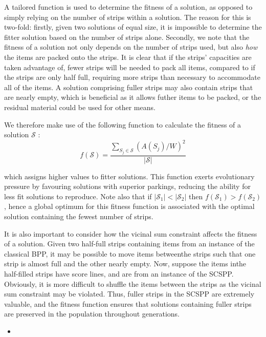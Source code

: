 \documentclass{elsarticle}
\begin{document}
A tailored function is used to determine the fitness of a solution, as opposed to simply relying on the number of strips within a solution. The reason for this is two-fold: firstly, given two solutions of equal size, it is impossible to determine the fitter solution based on the number of strips alone. Secondly, we note that the fitness of a solution not only depends on the number of strips used, but also \emph{how} the items are packed onto the strips. It is clear that if the strips' capacities are taken advantage of, fewer strips will be needed to pack all items, compared to if the strips are only half full, requiring more strips than necessary to accommodate all of the items. A solution comprising fuller strips may also contain strips that are nearly empty, which is beneficial as it allows futher items to be packed, or the residual material could be used for other means. 

We therefore make use of the following function to calculate the fitness of a solution $\mathcal{S}$ \cite{falkenauer1992}:
\begin{equation}
	f(\mathcal{S}) = \frac{\sum_{S_j \in \mathcal{S}} (A(S_j)/W)^2}{|\mathcal{S}|}
\end{equation}

\noindent which assigns higher values to fitter solutions. This function exerts evolutionary pressure by favouring solutions with superior parkings, reducing the ability for less fit solutions to reproduce. Note also that if $|\mathcal{S}_1| < |\mathcal{S}_2|$  then $f(\mathcal{S}_1) > f(\mathcal{S}_2)$, hence a global optimum for this fitness function is associated with the optimal solution containing the fewest number of strips.

It is also important to consider how the vicinal sum constraint affects the fitness of a solution. Given two half-full strips containing items from an instance of the classical BPP, it may be possible to move items betweenthe strips such that one strip is almost full and the other nearly empty. Now, suppose the items inthe half-filled strips have score lines, and are from an instance of the SCSPP. Obviously, it is more difficult to shuffle the items between the strips as the vicinal sum constraint may be violated. Thus, fuller strips in the SCSPP are extremely valuable, and the fitness function ensures that solutions containing fuller strips are preserved in the population throughout generations.

{\color{myRed}
\begin{itemize}[leftmargin=*]
	\item
\end{itemize}
}
\end{document}

